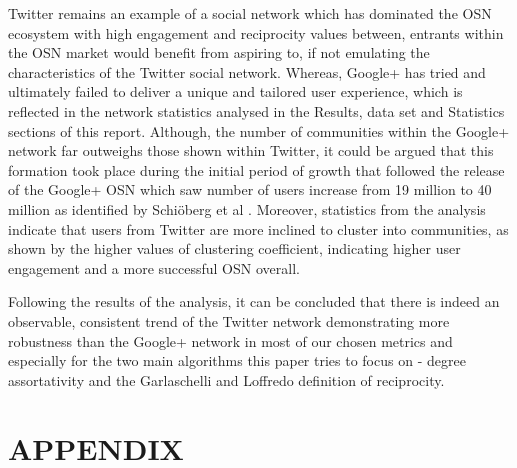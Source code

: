 \documentclass[a4paper, 10pt, conference]{ieeeconf}      %
\begin{document}
Twitter remains an example of a social network which has dominated the OSN ecosystem with high engagement and reciprocity values between, entrants within the OSN market would benefit from aspiring to, if not emulating the characteristics of the Twitter social network. Whereas, Google+ has tried and ultimately failed to deliver a unique and tailored user experience, which is reflected in the network statistics analysed in the Results, data set and Statistics sections of this report. Although, the number of communities within the Google+ network far outweighs those shown within Twitter, it could be argued that this formation took place during the initial period of growth that followed the release of the Google+ OSN which saw number of users increase from 19 million to 40 million as identified by Schi\"oberg et al \cite{c13}. Moreover, statistics from the analysis indicate that users from Twitter are more inclined to cluster into communities, as shown by the higher values of clustering coefficient, indicating higher user engagement and a more successful OSN overall.

Following the results of the analysis, it can be concluded that there is indeed an observable, consistent trend of the Twitter network demonstrating more robustness than the Google+ network in most of our chosen metrics and especially for the two main algorithms this paper tries to focus on - degree assortativity and the Garlaschelli and Loffredo definition of reciprocity. 

\addtolength{\textheight}{-12cm}   %







\section*{APPENDIX}
\end{document}
